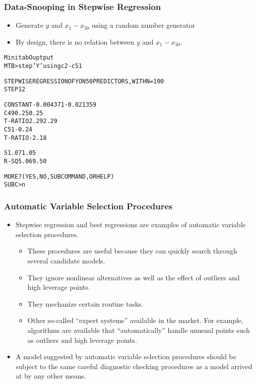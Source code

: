 \begin{frame}[fragile]
 \frametitle{Data-Snooping in Stepwise Regression}
 \begin{itemize}
   \item Generate $y$ and $x_1 - x_{50}$ using a random number generator
  \item By design, there is no relation between $y$ and $x_1 - x_{50}$.
    \end{itemize}
\begin{alltt}
Minitab Ouptput
    MTB > step 'Y' using c2-c51

 STEPWISE REGRESSION OF  Y  ON 50 PREDICTORS, WITH N =  100
    STEP        1        2

CONSTANT-0.004371-0.021359
C49          0.25     0.25
T-RATIO      2.29     2.29
C51                  -0.24
T-RATIO              -2.18

S            1.07     1.05
R-SQ         5.06     9.50

 MORE? (YES, NO, SUBCOMMAND, OR HELP)
SUBC> n
\end{alltt}

\end{frame}

\begin{frame}%
 \frametitle{Automatic Variable Selection Procedures}
 \begin{itemize}
 \item Stepwise regression and best regressions are examples of
automatic variable selection procedures.
 \begin{itemize}
 \item These procedures are useful because they can
quickly search through several candidate models.
\item They ignore nonlinear alternatives as well as the effect of
outliers and high leverage points.
\item They  mechanize certain routine tasks.
\item Other so-called
``expert systems'' available in the market. For example, algorithms
are available that ``automatically'' handle unusual points such as
outliers and high leverage points.
    \end{itemize}
   \item A model suggested by automatic variable selection
procedures should be subject to the same careful diagnostic checking
procedures as a model arrived at by any other means.
    \end{itemize}
\end{frame}

